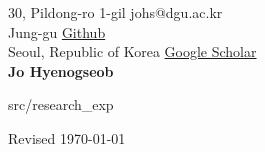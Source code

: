 \documentclass{cv} %
\begin{document}
30, Pildong-ro 1-gil \hfill johs@dgu.ac.kr\\
Jung-gu \hfill \href{https://github.com/johyeongseob}{Github}\\
Seoul, Republic of Korea \hfill \href{https://scholar.google.com/citations?user=oIyfv_gAAAAJ&hl=en}{Google Scholar}\\

\hfil{\namesize\bf Jo Hyenogseob}\hfil





 {src/research_exp}




%



\hfill Revised \today
\end{document}
